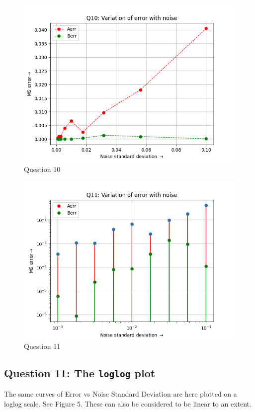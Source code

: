 \documentclass[11pt, a4paper]{article}
\begin{document}
    \begin{figure}[!tbh]
   	\centering
   	\includegraphics[scale=0.5]{Q10.png} 
	\caption{Question 10}
   	\label{fig:Q10}
    \end{figure}   
    
    \begin{figure}[!tbh]
   	\centering
   	\includegraphics[scale=0.5]{Q11.png} 
	\caption{Question 11}
   	\label{fig:Q11}
    \end{figure}
    
   \subsection{Question 11: The \texttt{loglog} plot}
    The same curves of Error vs Noise Standard Deviation are here plotted on a loglog scale. See Figure 5. These can also be considered to be linear to an extent.
\end{document}
